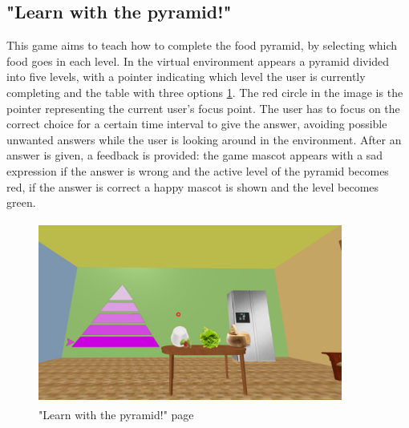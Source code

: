 \subsection{"Learn with the pyramid!"}
This game aims to teach how to complete the food pyramid, by selecting which food goes in each level. In the virtual environment appears a pyramid divided into five levels, with a pointer indicating which level the user is currently completing and the table with three options \ref{fig:pyramid}. The red circle in the image is the pointer representing the current user's focus point. The user has to focus on the correct choice for a certain time interval to give the answer, avoiding possible unwanted answers while the user is looking around in the environment. After an answer is given, a feedback is provided: the game mascot appears with a sad expression if the answer is wrong and the active level of the pyramid becomes red, if the answer is correct a happy mascot is shown and the level becomes green.\\
\begin{figure}[H]
\centering
\includegraphics[width=10cm, height=6cm]{immagini/Pyramid.png}
\caption{"Learn with the pyramid!" page}\label{fig:pyramid}
\end{figure}
